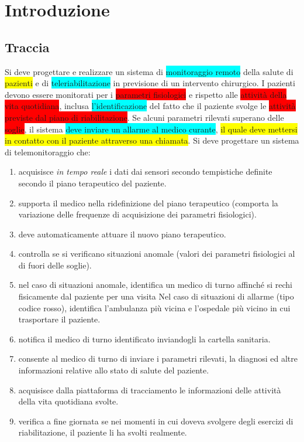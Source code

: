 \documentclass[a4paper,11pt,oneside, table]{article}
\begin{document}
    \printindex
    \tableofcontents
    \renewcommand{\baselinestretch}{1.5}

\section{Introduzione}

\subsection{Traccia}

Si deve progettare e realizzare un sistema di \colorbox{cyan}{monitoraggio remoto} della salute di \colorbox{yellow}{pazienti} e di \colorbox{cyan}{teleriabilitazione} in previsione di un intervento chirurgico.
I pazienti devono essere monitorati per i \colorbox{red}{parametri fisiologici} e rispetto alle \colorbox{red}{attività della vita quotidiana}, inclusa \colorbox{cyan}{l'identificazione} del fatto che il paziente svolge le \colorbox{red}{attività previste dal piano di riabilitazione}.
Se alcuni parametri rilevati superano delle \colorbox{red}{soglie}, il sistema \colorbox{cyan}{deve inviare un allarme al medico curante}, \colorbox{yellow}{il quale deve mettersi in contatto con il paziente attraverso una chiamata}.
Si deve progettare un sistema di telemonitoraggio che:

\begin{enumerate}
  \item acquisisce \textit{in tempo reale} i dati dai sensori secondo tempistiche definite secondo il piano terapeutico del paziente.
  \item supporta il medico nella ridefinizione del piano terapeutico (comporta la variazione delle frequenze di acquisizione dei parametri fisiologici).
  \item deve automaticamente attuare il nuovo piano terapeutico.
  \item controlla se si verificano situazioni anomale (valori dei parametri fisiologici al di fuori delle soglie).
  \item nel caso di situazioni anomale, identifica un medico di turno affinché si rechi fisicamente dal paziente per una visita Nel caso di situazioni di allarme (tipo codice rosso), identifica l'ambulanza pi\`u vicina e l'ospedale pi\`u vicino in cui trasportare il paziente.
  \item notifica il medico di turno identificato inviandogli la cartella sanitaria.
  \item consente al medico di turno di inviare i parametri rilevati, la diagnosi ed altre informazioni relative allo stato di salute del paziente.
  \item acquisisce dalla piattaforma di tracciamento le informazioni delle attività della vita quotidiana svolte.
  \item verifica a fine giornata se nei momenti in cui doveva svolgere degli esercizi di riabilitazione, il paziente li ha svolti realmente.
\end{enumerate}
\end{document}
